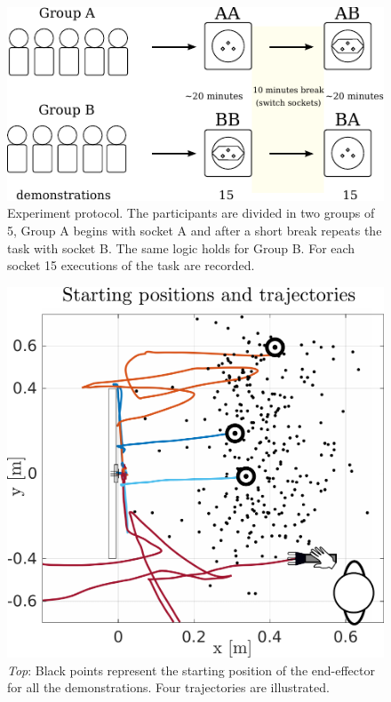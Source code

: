 \documentclass[final,3p,times,twocolumn]{elsarticle}
\begin{document}
\begin{figure}
\centering
 \includegraphics[width=0.9\linewidth]{./Figures/Fig/experiment_design_v2.pdf}
 \caption{Experiment protocol. The participants are divided in two groups of 5, Group A begins with socket A 
 and after a short break repeats the task with socket B. The same logic holds for Group B.
 For each socket 15 executions of the task are recorded.}
 \label{fig:experiment_design}
\end{figure}


\begin{figure}
 \centering
   \includegraphics[width=0.9\linewidth]{./Figure/time_taken.pdf}
   \caption{\textit{Top}: Black points represent the starting position of the end-effector
   for all the demonstrations. Four trajectories are illustrated.}
  \label{fig:experiment_setup_data}
\end{figure}
\end{document}
